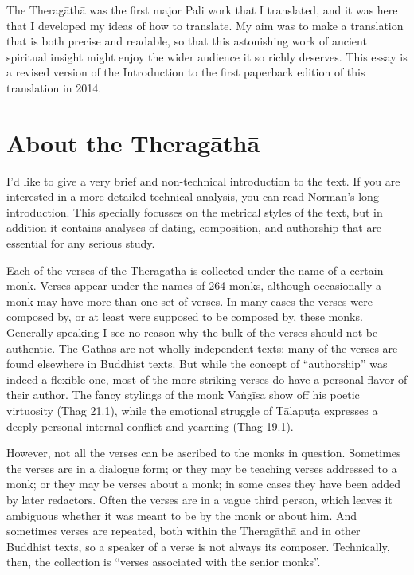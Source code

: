 \documentclass[12pt,openany]{book}%
\begin{document}
The \textsanskrit{Theragāthā} was the first major Pali work that I translated, and it was here that I developed my ideas of how to translate. My aim was to make a translation that is both precise and readable, so that this astonishing work of ancient spiritual insight might enjoy the wider audience it so richly deserves. This essay is a revised version of the Introduction to the first paperback edition of this translation in 2014.

\section*{About the \textsanskrit{Theragāthā}}

I’d like to give a very brief and non-technical introduction to the text. If you are interested in a more detailed technical analysis, you can read Norman’s long introduction. This specially focusses on the metrical styles of the text, but in addition it contains analyses of dating, composition, and authorship that are essential for any serious study.

Each of the verses of the \textsanskrit{Theragāthā} is collected under the name of a certain monk. Verses appear under the names of 264 monks, although occasionally a monk may have more than one set of verses. In many cases the verses were composed by, or at least were supposed to be composed by, these monks. Generally speaking I see no reason why the bulk of the verses should not be authentic. The \textsanskrit{Gāthās} are not wholly independent texts: many of the verses are found elsewhere in Buddhist texts. But while the concept of “authorship” was indeed a flexible one, most of the more striking verses do have a personal flavor of their author. The fancy stylings of the monk \textsanskrit{Vaṅgīsa} show off his poetic virtuosity (Thag 21.1), while the emotional struggle of \textsanskrit{Tālapuṭa} expresses a deeply personal internal conflict and yearning (Thag 19.1).

However, not all the verses can be ascribed to the monks in question. Sometimes the verses are in a dialogue form; or they may be teaching verses addressed to a monk; or they may be verses about a monk; in some cases they have been added by later redactors. Often the verses are in a vague third person, which leaves it ambiguous whether it was meant to be by the monk or about him. And sometimes verses are repeated, both within the \textsanskrit{Theragāthā} and in other Buddhist texts, so a speaker of a verse is not always its composer. Technically, then, the collection is “verses associated with the senior monks”.
\end{document}
